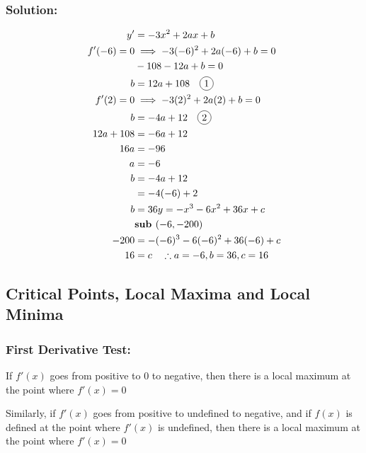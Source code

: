\documentclass{article}
\newcommand*\circled[1]{\tikz[baseline=(char.base)]{
            \node[shape=circle,draw,inner sep=2pt] (char) {#1};}}
\begin{document}
\subsubsection*{Solution:}
\begin{align*}
    y'&=-3x^2+2ax+b\\
    f'(-6)=0 &\implies -3(-6)^2+2a(-6)+b=0\\
    &-108-12a+b=0\\
    b&=12a+108 \quad \circled{1}\\
    f'(2)=0 &\implies -3(2)^2+2a(2)+b=0\\
    b&=-4a+12 \quad \circled{2}\\
    12a+108&=-6a+12\\
    16a&=-96\\
    a&=-6\\
    b&=-4a+12\\
    &=-4(-6)+2\\
    b&=36
    y=-x^3-6x^2+36x+c\\
    &\textbf{sub } (-6,-200)\\
    -200&=-(-6)^3-6(-6)^2+36(-6)+c\\
    16&=c \quad \therefore a=-6, b=36, c=16
\end{align*}
\subsection{Critical Points, Local Maxima and Local Minima}
\subsubsection{First Derivative Test:}
If $f'(x)$ goes from positive to 0 to negative, then there is a local maximum at the point where $f'(x)=0$
\begin{center}
\end{center}

Similarly, if $f'(x)$ goes from positive to undefined to negative, and if $f(x)$ is defined at the point where $f'(x)$ is undefined, then there is a local maximum at the point where $f'(x)=0$
\end{document}
